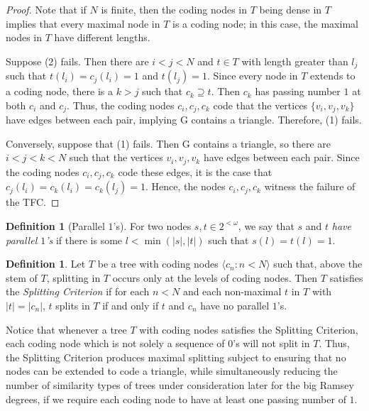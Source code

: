\documentclass{amsart}
\theoremstyle{remark}
\theoremstyle{definition}
\newtheorem{defn}[thm]{Definition}
\theoremstyle{remark}
\newcommand{\om}{\omega}
\newcommand{\contains}{\supseteq}
\newcommand{\G}{\mathrm{G}}
\newcommand{\lgl}{\langle}
\newcommand{\rgl}{\rangle}
\begin{document}
\begin{proof}
Note that if  $N$ is finite,
then the coding nodes in $T$ being dense in $T$ implies  that every maximal node in $T$ is a coding node; in this case, the maximal nodes in $T$ have different lengths.


Suppose (2) fails.
Then there are $i<j<N$
 and  $t\in T$ with length greater than $l_j$ such that
$t(l_i)=c_j(l_i)=1$ and $t(l_j)=1$.
Since every node in $T$ extends to a coding  node, there is a $k>j$ such that $c_k\contains t$.
Then   $c_k$ has passing number $1$ at both $c_i$ and $c_j$.
Thus, the coding nodes $c_i,c_j,c_k$ code that
the vertices $\{v_i,v_j,v_k\}$ have edges between each pair, implying  $\G$ contains a triangle.
Therefore, (1) fails.



Conversely, suppose that  (1) fails.  Then
$\G$ contains a triangle, so
 there are
$i<j<k<N$  such that the vertices  $v_i,v_j,v_k$ have edges between each pair.
Since the coding nodes $c_i,c_j,c_k$ code these edges,
it is the case that
$c_j(l_i)= c_k(l_i)=c_k(l_j)=1$.
Hence, the nodes $c_i,c_j,c_k$ witness the failure of the TFC.
\end{proof}





\begin{defn}[Parallel $1$'s]\label{defn.parallel1s}
For two nodes $s,t\in 2^{<\om}$, we  say that $s$ and $t$  {\em have  parallel $1$'s} if there is some $l<\min(|s|,|t|)$ such that $s(l)=t(l)=1$.
\end{defn}





\begin{defn}\label{defn.p1cstft}
Let $T$ be a tree with coding nodes $\lgl c_n:n<N\rgl$
such that, above the stem of $T$,  splitting in $T$ occurs only at the levels of coding nodes.
Then $T$
satisfies the {\em Splitting Criterion}
if for each  $n<N$ and each non-maximal $t$ in $T$ with $|t|=|c_n|$,
$t$ splits in $T$ if and only if   $t$ and $c_n$ have no parallel $1$'s.
\end{defn}


Notice that  whenever a  tree $T$ with coding nodes satisfies the Splitting Criterion,
each coding node which is not solely a sequence of $0$'s
will not split in $T$.
Thus, the Splitting Criterion
produces maximal splitting subject to
ensuring that no nodes can be extended to code a triangle,
while simultaneously  reducing the number of similarity types of trees under consideration later for the big Ramsey degrees, if we require each coding node to have at least one passing number of $1$.
\end{document}
